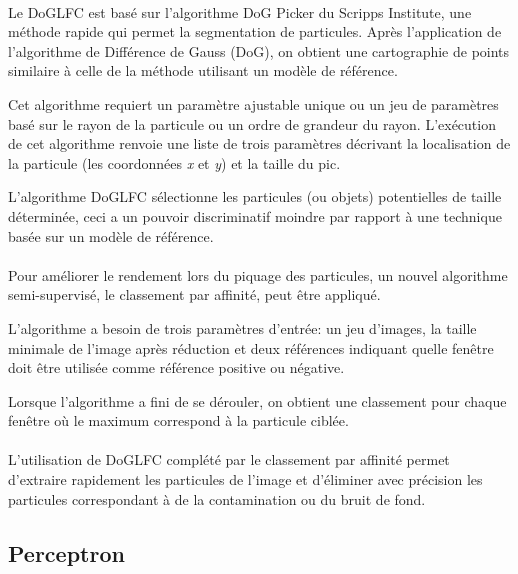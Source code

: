 \documentclass[11pt,a4paper]{report}
\begin{document}
\paragraph*{}
Le DoGLFC est basé sur l'algorithme DoG Picker du Scripps Institute\cite{Scripps:url}, une méthode rapide qui permet la segmentation de particules. Après l'application de l'algorithme de Différence de Gauss (DoG), on obtient une cartographie de points similaire à celle de la méthode utilisant un modèle de référence.%

\noindent
Cet algorithme requiert un paramètre ajustable unique ou un jeu de paramètres basé sur le rayon de la particule ou un ordre de grandeur du rayon. L'exécution de cet algorithme renvoie une liste de trois paramètres décrivant la localisation de la particule (les coordonnées \emph{x} et \emph{y}) et la taille du pic.%

\noindent
L'algorithme DoGLFC sélectionne les particules (ou objets) potentielles de taille déterminée, ceci a un pouvoir discriminatif moindre par rapport à une technique basée sur un modèle de référence.

\paragraph*{}
Pour améliorer le rendement lors du piquage des particules, un nouvel algorithme semi-supervisé, le classement par affinité, peut \^etre appliqué.

\noindent
L’algorithme a besoin de trois paramètres d'entrée: un jeu d'images, la taille minimale de l'image après réduction et deux références indiquant quelle fen\^etre doit \^etre utilisée comme référence positive ou négative.

\noindent
Lorsque l'algorithme a fini de se dérouler, on obtient une classement pour chaque fen\^etre où le maximum correspond à la particule ciblée.

\paragraph*{}
L'utilisation de DoGLFC complété par le classement par affinité permet d'extraire
rapidement les particules de l'image et d'éliminer avec précision les particules correspondant à de la contamination ou du bruit de fond.

\subsection{Perceptron}
\end{document}
